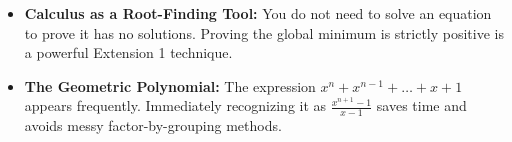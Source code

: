 \begin{takeaways}
\begin{itemize}[leftmargin=*]
\item \textbf{Calculus as a Root-Finding Tool:} You do not need to solve an equation to prove it has no solutions. Proving the global minimum is strictly positive is a powerful Extension 1 technique.
\item \textbf{The Geometric Polynomial:} The expression $x^n + x^{n-1} + \dots + x + 1$ appears frequently. Immediately recognizing it as $\frac{x^{n+1}-1}{x-1}$ saves time and avoids messy factor-by-grouping methods.
\end{itemize}
\end{takeaways}

